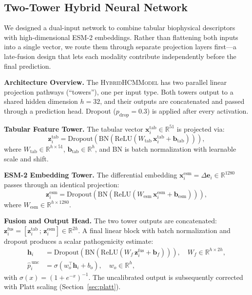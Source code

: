 \documentclass[conference]{IEEEtran}
\newcommand{\Deltaemb}{\Delta\mathbf{e}}
\newcommand{\xtab}{\mathbf{x}^{\mathrm{tab}}}
\newcommand{\xesm}{\mathbf{x}^{\mathrm{esm}}}
\newcommand{\ztab}{\mathbf{z}^{\mathrm{tab}}}
\newcommand{\zesm}{\mathbf{z}^{\mathrm{esm}}}
\newcommand{\zfus}{\mathbf{z}^{\mathrm{fus}}}
\begin{document}
\subsection{Two-Tower Hybrid Neural Network}

We designed a dual-input network to combine tabular biophysical descriptors with high-dimensional ESM-2 embeddings. Rather than flattening both inputs into a single vector, we route them through separate projection layers first---a late-fusion design that lets each modality contribute independently before the final prediction.

\vspace{2mm}\noindent\textbf{Architecture Overview.}
The \textsc{HybridHCMModel} has two parallel linear projection pathways (``towers''), one per input type. Both towers output to a shared hidden dimension $h = 32$, and their outputs are concatenated and passed through a prediction head. Dropout ($p_\mathrm{drop} = 0.3$) is applied after every activation.

\vspace{2mm}\noindent\textbf{Tabular Feature Tower.}
The tabular vector $\xtab_i \in \mathbb{R}^{51}$ is projected via:
\begin{equation}
  \ztab_i = \mathrm{Dropout}\!\left(
      \mathrm{BN}\!\left(
        \mathrm{ReLU}\!\left(W_\mathrm{tab}\,\xtab_i + \mathbf{b}_\mathrm{tab}\right)
      \right)
    \right),
  \label{eq:tab_tower}
\end{equation}
where $W_\mathrm{tab}\in\mathbb{R}^{h\times 51}$, $\mathbf{b}_\mathrm{tab}\in\mathbb{R}^h$, and BN is batch normalization with learnable scale and shift.

\vspace{2mm}\noindent\textbf{ESM-2 Embedding Tower.}
The differential embedding $\xesm_i = \Deltaemb_i \in \mathbb{R}^{1280}$ passes through an identical projection:
\begin{equation}
  \zesm_i = \mathrm{Dropout}\!\left(
      \mathrm{BN}\!\left(
        \mathrm{ReLU}\!\left(W_\mathrm{esm}\,\xesm_i + \mathbf{b}_\mathrm{esm}\right)
      \right)
    \right),
  \label{eq:esm_tower}
\end{equation}
where $W_\mathrm{esm}\in\mathbb{R}^{h\times 1280}$.

\vspace{2mm}\noindent\textbf{Fusion and Output Head.}
The two tower outputs are concatenated: $\zfus_i = [\ztab_i\,;\,\zesm_i] \in \mathbb{R}^{2h}$. A final linear block with batch normalization and dropout produces a scalar pathogenicity estimate:
\begin{align}
  \mathbf{h}_i &= \mathrm{Dropout}\!\left(\mathrm{BN}\!\left(\mathrm{ReLU}(W_f\,\zfus_i + \mathbf{b}_f)\right)\right),
                  \quad W_f\in\mathbb{R}^{h\times 2h}, \label{eq:fusion}\\
  \hat{p}_i^{\,\mathrm{unc}} &= \sigma\!\left(w_o^\top\mathbf{h}_i + b_o\right),
                  \quad w_o\in\mathbb{R}^h, \label{eq:output}
\end{align}
with $\sigma(x)=(1+e^{-x})^{-1}$. The uncalibrated output is subsequently corrected with Platt scaling (Section~\ref{sec:platt}).
\end{document}
